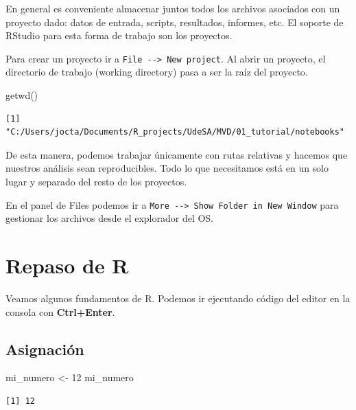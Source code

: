 \documentclass[
  letterpaper,
  DIV=11,
  numbers=noendperiod]{scrartcl}
\newenvironment{Shaded}{\begin{snugshade}}{\end{snugshade}}
\newcommand{\DecValTok}[1]{\textcolor[rgb]{0.68,0.00,0.00}{#1}}
\newcommand{\FunctionTok}[1]{\textcolor[rgb]{0.28,0.35,0.67}{#1}}
\newcommand{\NormalTok}[1]{\textcolor[rgb]{0.00,0.23,0.31}{#1}}
\newcommand{\OtherTok}[1]{\textcolor[rgb]{0.00,0.23,0.31}{#1}}
\begin{document}
En general es conveniente almacenar juntos todos los archivos asociados
con un proyecto dado: datos de entrada, scripts, resultados, informes,
etc. El soporte de RStudio para esta forma de trabajo son los proyectos.

Para crear un proyecto ir a
\texttt{File\ -\/-\textgreater{}\ New\ project}. Al abrir un proyecto,
el directorio de trabajo (working directory) pasa a ser la raíz del
proyecto.

\begin{Shaded}
\begin{Highlighting}[]
\FunctionTok{getwd}\NormalTok{()}
\end{Highlighting}
\end{Shaded}

\begin{verbatim}
[1] "C:/Users/jocta/Documents/R_projects/UdeSA/MVD/01_tutorial/notebooks"
\end{verbatim}

De esta manera, podemos trabajar únicamente con rutas relativas y
hacemos que nuestros análisis sean reproducibles. Todo lo que
necesitamos está en un solo lugar y separado del resto de los proyectos.

En el panel de Files podemos ir a
\texttt{More\ -\/-\textgreater{}\ Show\ Folder\ in\ New\ Window} para
gestionar los archivos desde el explorador del OS.

\section{Repaso de R}\label{repaso-de-r}

Veamos algunos fundamentos de R. Podemos ir ejecutando código del editor
en la consola con \textbf{Ctrl+Enter}.

\subsection{Asignación}\label{asignaciuxf3n}

\begin{Shaded}
\begin{Highlighting}[]
\NormalTok{mi\_numero }\OtherTok{\textless{}{-}} \DecValTok{12} 
\NormalTok{mi\_numero}
\end{Highlighting}
\end{Shaded}

\begin{verbatim}
[1] 12
\end{verbatim}
\end{document}
